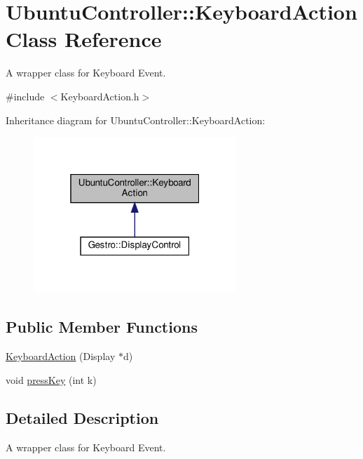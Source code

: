 \hypertarget{classUbuntuController_1_1KeyboardAction}{}\section{Ubuntu\+Controller\+:\+:Keyboard\+Action Class Reference}
\label{classUbuntuController_1_1KeyboardAction}


A wrapper class for Keyboard Event.  




{\ttfamily \#include $<$Keyboard\+Action.\+h$>$}



Inheritance diagram for Ubuntu\+Controller\+:\+:Keyboard\+Action\+:
\nopagebreak
\begin{figure}[H]
\begin{center}
\leavevmode
\includegraphics[width=217pt]{classUbuntuController_1_1KeyboardAction__inherit__graph}
\end{center}
\end{figure}
\subsection*{Public Member Functions}
\begin{DoxyCompactItemize}
\item 
\hyperlink{classUbuntuController_1_1KeyboardAction_af59163694e9b55ceaa75d779363e7fc9}{Keyboard\+Action} (Display $\ast$d)
\item 
void \hyperlink{classUbuntuController_1_1KeyboardAction_ab09e3956685d6fb11cd1cdf86a673b48}{press\+Key} (int k)
\end{DoxyCompactItemize}


\subsection{Detailed Description}
A wrapper class for Keyboard Event. 

